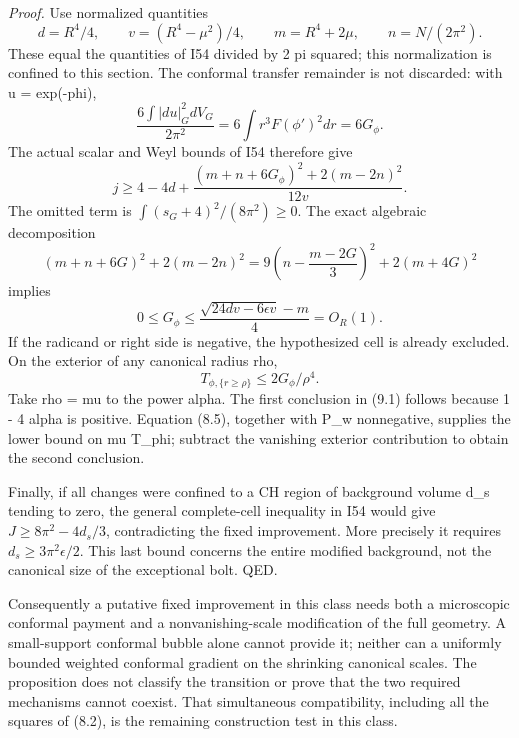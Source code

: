 \documentclass[
  10pt,
]{article}
\begin{document}
\emph{Proof.} Use normalized quantities \[
 d=R^4/4,\qquad v=(R^4-\mu^2)/4,\qquad
 m=R^4+2\mu,\qquad n=N/(2\pi^2).
\] These equal the quantities of I54 divided by 2 pi squared; this
normalization is confined to this section. The conformal transfer
remainder is not discarded: with u = exp(-phi), \[
 \frac{6\int|du|_G^2dV_G}{2\pi^2}
                       =6\int r^3F(\phi')^2dr=6G_\phi.
\] The actual scalar and Weyl bounds of I54 therefore give \[
 j\ge4-4d+
       \frac{(m+n+6G_\phi)^2+2(m-2n)^2}{12v}.
\] The omitted term is \(\int(s_G+4)^2/(8\pi^2)\ge0\). The exact
algebraic decomposition \[
 (m+n+6G)^2+2(m-2n)^2
             =9\left(n-\frac{m-2G}{3}\right)^2+2(m+4G)^2
\] implies \[
 0\le G_\phi\le
             \frac{\sqrt{24dv-6\epsilon v}-m}{4}=O_R(1). \tag{9.2}
\] If the radicand or right side is negative, the hypothesized cell is
already excluded. On the exterior of any canonical radius rho, \[
 T_{\phi,\{r\ge\rho\}}\le2G_\phi/\rho^4.
\] Take rho = mu to the power alpha. The first conclusion in (9.1)
follows because 1 - 4 alpha is positive. Equation (8.5), together with
P\_w nonnegative, supplies the lower bound on mu T\_phi; subtract the
vanishing exterior contribution to obtain the second conclusion.

Finally, if all changes were confined to a CH region of background
volume d\_s tending to zero, the general complete-cell inequality in I54
would give \(J\ge8\pi^2-4d_s/3\), contradicting the fixed improvement.
More precisely it requires \(d_s\ge3\pi^2\epsilon/2\). This last bound
concerns the entire modified background, not the canonical size of the
exceptional bolt. QED.

Consequently a putative fixed improvement in this class needs both a
microscopic conformal payment and a nonvanishing-scale modification of
the full geometry. A small-support conformal bubble alone cannot provide
it; neither can a uniformly bounded weighted conformal gradient on the
shrinking canonical scales. The proposition does not classify the
transition or prove that the two required mechanisms cannot coexist.
That simultaneous compatibility, including all the squares of (8.2), is
the remaining construction test in this class.
\end{document}
